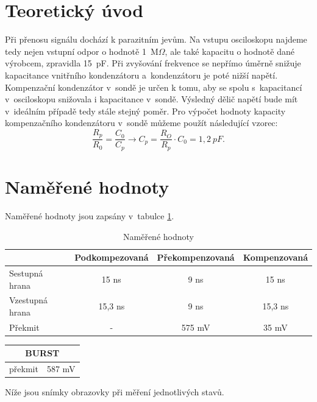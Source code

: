 \documentclass[a4paper,12pt]{article}   %
\newcommand{\tohm}{$\Omega$}
\begin{document}
\section{Teoretický úvod}
\label{chap:teoreticky_uvod}
Při přenosu signálu dochází k parazitním jevům. Na vstupu osciloskopu najdeme tedy nejen vstupní odpor o hodnotě 1~M\tohm , ale také kapacitu o hodnotě dané výrobcem, zpravidla 15~pF. Při zvyšování frekvence se nepřímo úměrně snižuje kapacitance vnitřního kondenzátoru a~kondenzátoru je poté nižší napětí. Kompenzační kondenzátor v~sondě je určen k tomu, aby se spolu s~kapacitancí v~osciloskopu snižovala i kapacitance v~sondě. Výsledný dělič napětí bude mít v~ideálním případě tedy stále stejný poměr. Pro výpočet hodnoty kapacity kompenzačního kondenzátoru v~sondě můžeme použít následující vzorec:
\begin{equation}
  \frac{R_p}{R_0} = \frac{C_0}{C_p} \rightarrow C_p=\frac{R_O}{R_p}\cdot C_0 = 1,2~pF.
  \label{eq:komp_final}
\end{equation}


\section{Naměřené hodnoty}
\label{chap:namerene_hodnoty}
Naměřené hodnoty jsou zapsány v~tabulce \ref{tab:hodnoty}.

\begin{table}[h!]
  \centering
  \begin{tabular}{|l|c||c||c|}
    \hline
    &Podkompezovaná&Překompenzovaná &Kompenzovaná\\\hline
    Sestupná hrana &15 ns&9 ns&15 ns\\\hline
    Vzestupná hrana&15,3 ns&9 ns&15,3 ns\\\hline
    Překmit&-&575 mV&35 mV\\\hline
  \end{tabular}
  \caption{Naměřené hodnoty}
  \label{tab:hodnoty}
\end{table}

\begin{table}[h!]
  \centering
  \begin{tabular}{|c|c|}
    \hline
    \multicolumn{2}{|c|}{BURST}\\\hline
    překmit&587 mV\\\hline
  \end{tabular}
\end{table}

Níže jsou snímky obrazovky při měření jednotlivých stavů.
\end{document}
